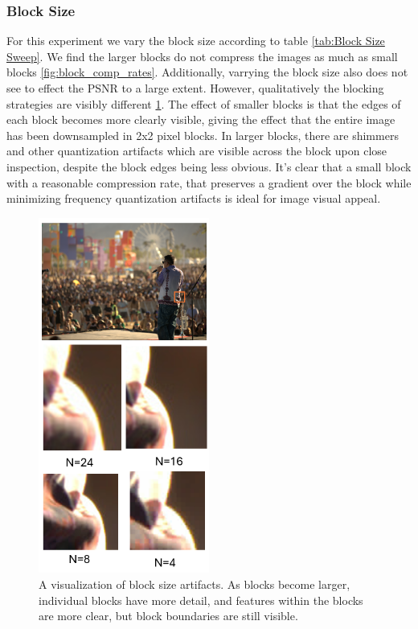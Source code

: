 \subsubsection{Block Size}

For this experiment we vary the block size according to table \ref{tab:Block Size Sweep}. We find the larger blocks do not compress the images as much as small blocks \ref{fig:block_comp_rates}. Additionally, varrying the block size also does not see to effect the PSNR to a large extent. However, qualitatively the blocking strategies are visibly different \ref{fig:block_quantization_artifacts}. The effect of smaller blocks is that the edges of each block becomes more clearly visible, giving the effect that the entire image has been downsampled in 2x2 pixel blocks. In larger blocks, there are shimmers and other quantization artifacts which are visible across the block upon close inspection, despite the block edges being less obvious. It's clear that a small block with a reasonable compression rate, that preserves a gradient over the block while minimizing frequency quantization artifacts is ideal for image visual appeal.

\begin{figure}
    \includegraphics[width=0.5\textwidth]{assets/Block Quantization Artifacts.png}
    \caption{A visualization of block size artifacts. As blocks become larger, individual blocks have more detail, and features within the blocks are more clear, but block boundaries are still visible.}
    \label{fig:block_quantization_artifacts}
\end{figure}

